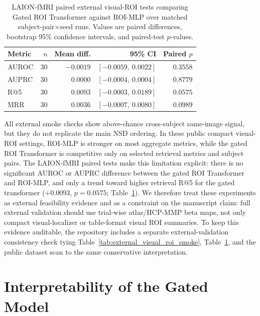 \documentclass{article}
\begin{document}
\begin{table}[!htbp]
  \centering
  \caption{LAION-fMRI paired external visual-ROI tests comparing Gated ROI Transformer against ROI-MLP over matched subject-pair$\times$seed runs. Values are paired differences, bootstrap 95\% confidence intervals, and paired-test $p$-values.}
  \label{tab:laion_external_pairwise}
  \scriptsize
  \setlength{\tabcolsep}{6pt}
  \renewcommand{\arraystretch}{1.15}
  \begin{tabular}{lrrrr}
    \toprule
    Metric & $n$ & Mean diff. & 95\% CI & Paired $p$ \\
    \midrule
    AUROC & 30 & $-0.0019$ & $[-0.0059,\ 0.0022]$ & $0.3558$ \\
    AUPRC & 30 & $0.0000$ & $[-0.0004,\ 0.0004]$ & $0.8779$ \\
    R@5 & 30 & $0.0093$ & $[-0.0003,\ 0.0189]$ & $0.0575$ \\
    MRR & 30 & $0.0036$ & $[-0.0007,\ 0.0080]$ & $0.0989$ \\
    \bottomrule
  \end{tabular}
\end{table}

All external smoke checks show above-chance cross-subject same-image signal, but they do not replicate the main NSD ordering. In these public compact visual-ROI settings, ROI-MLP is stronger on most aggregate metrics, while the gated ROI Transformer is competitive only on selected retrieval metrics and subject pairs. The LAION-fMRI paired tests make this limitation explicit: there is no significant AUROC or AUPRC difference between the gated ROI Transformer and ROI-MLP, and only a trend toward higher retrieval R@5 for the gated transformer ($+0.0093$, $p=0.0575$; Table~\ref{tab:laion_external_pairwise}). We therefore treat these experiments as external feasibility evidence and as a constraint on the manuscript claim: full external validation should use trial-wise atlas/HCP-MMP beta maps, not only compact visual-localizer or table-format visual ROI summaries. To keep this evidence auditable, the repository includes a separate external-validation consistency check tying Table~\ref{tab:external_visual_roi_smoke}, Table~\ref{tab:laion_external_pairwise}, and the public dataset scan to the same conservative interpretation.

\section{Interpretability of the Gated Model}
\end{document}
